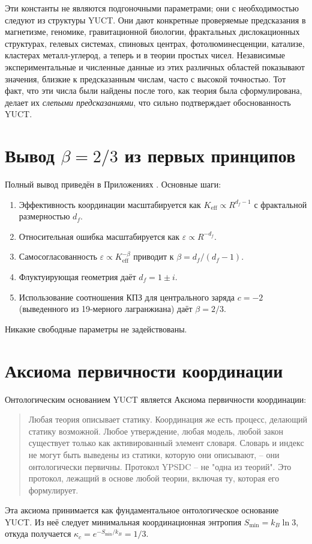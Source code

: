 \documentclass[12pt,a4paper]{article}
\begin{document}
	Эти константы не являются подгоночными параметрами; они с необходимостью следуют из структуры YUCT. Они дают конкретные проверяемые предсказания в магнетизме, геномике, гравитационной биологии, фрактальных дислокационных структурах, гелевых системах, спиновых центрах, фотолюминесценции, катализе, кластерах металл-углерод, а теперь и в теории простых чисел. Независимые экспериментальные и численные данные из этих различных областей показывают значения, близкие к предсказанным числам, часто с высокой точностью. Тот факт, что эти числа были найдены после того, как теория была сформулирована, делает их \emph{слепыми предсказаниями}, что сильно подтверждает обоснованность YUCT.
	
	\appendix
	\section{Вывод \(\beta = 2/3\) из первых принципов}
	\label{app:beta_derivation}
	Полный вывод приведён в Приложениях \cite{AppendixL, AppendixY}. Основные шаги:
	\begin{enumerate}
		\item Эффективность координации масштабируется как \(K_{\mathrm{eff}} \propto R^{d_f-1}\) с фрактальной размерностью \(d_f\).
		\item Относительная ошибка масштабируется как \(\varepsilon \propto R^{-d_f}\).
		\item Самосогласованность \(\varepsilon \propto K_{\mathrm{eff}}^{-\beta}\) приводит к \(\beta = d_f/(d_f-1)\).
		\item Флуктуирующая геометрия даёт \(d_f = 1 \pm i\).
		\item Использование соотношения КПЗ для центрального заряда \(c = -2\) (выведенного из 19-мерного лагранжиана) даёт \(\beta = 2/3\).
	\end{enumerate}
	Никакие свободные параметры не задействованы.
	
	\section{Аксиома первичности координации}
	\label{app:axiom}
	Онтологическим основанием YUCT является Аксиома первичности координации:
	\begin{quote}
		Любая теория описывает статику. Координация же есть процесс, делающий статику возможной. Любое утверждение, любая модель, любой закон существует только как активированный элемент словаря. Словарь и индекс не могут быть выведены из статики, которую они описывают, -- они онтологически первичны. Протокол YPSDC -- не "одна из теорий". Это протокол, лежащий в основе любой теории, включая ту, которая его формулирует.
	\end{quote}
	Эта аксиома принимается как фундаментальное онтологическое основание YUCT. Из неё следует минимальная координационная энтропия \(S_{\min} = k_B \ln 3\), откуда получается \(\kappa_c = e^{-S_{\min}/k_B} = 1/3\).
	
\end{document}
